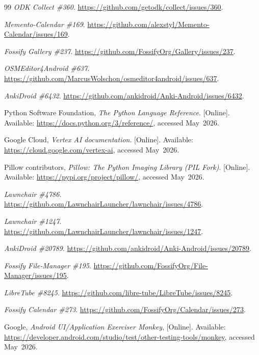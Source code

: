\documentclass[10pt,conference,a4paper]{IEEEtran}
\begin{document}
\begin{thebibliography}{99}
  \emph{ODK Collect \#360}.
  \url{https://github.com/getodk/collect/issues/360}.

  \emph{Memento-Calendar \#169}.
  \url{https://github.com/alexstyl/Memento-Calendar/issues/169}.

  \emph{Fossify Gallery \#237}.
  \url{https://github.com/FossifyOrg/Gallery/issues/237}.

  \emph{OSMEditor4Android \#637}.
  \url{https://github.com/MarcusWolschon/osmeditor4android/issues/637}.

  \emph{AnkiDroid \#6432}.
  \url{https://github.com/ankidroid/Anki-Android/issues/6432}.

  Python Software Foundation, \emph{The Python Language Reference}.
  [Online]. Available:
  \url{https://docs.python.org/3/reference/}, accessed May~2026.

  Google Cloud, \emph{Vertex AI documentation}.
  [Online]. Available:
  \url{https://cloud.google.com/vertex-ai}, accessed May~2026.

  Pillow contributors, \emph{Pillow: The Python Imaging Library (PIL Fork)}.
  [Online]. Available:
  \url{https://pypi.org/project/pillow/}, accessed May~2026.


  \emph{Lawnchair \#4786}.
  \url{https://github.com/LawnchairLauncher/lawnchair/issues/4786}.

  \emph{Lawnchair \#1247}.
  \url{https://github.com/LawnchairLauncher/lawnchair/issues/1247}.

  \emph{AnkiDroid \#20789}.
  \url{https://github.com/ankidroid/Anki-Android/issues/20789}.

  \emph{Fossify File-Manager \#195}.
  \url{https://github.com/FossifyOrg/File-Manager/issues/195}.

  \emph{LibreTube \#8245}.
  \url{https://github.com/libre-tube/LibreTube/issues/8245}.

  \emph{Fossify Calendar \#273}.
  \url{https://github.com/FossifyOrg/Calendar/issues/273}.

  Google, \emph{Android UI/Application Exerciser Monkey},
  [Online]. Available:
  \url{https://developer.android.com/studio/test/other-testing-tools/monkey},
  accessed May~2026.


\end{thebibliography}
\end{document}
